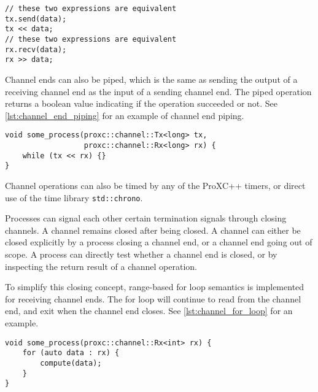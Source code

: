 \begin{lstfloat}
\begin{lstlisting}[caption={Channel operation and operator overloading.}, label={lst:channel_operation_operator_overloading}, style={CustomC++}]
// these two expressions are equivalent
tx.send(data);
tx << data;
// these two expressions are equivalent
rx.recv(data);
rx >> data;
\end{lstlisting}
\end{lstfloat}

Channel ends can also be piped, which is the same as sending the output of a receiving channel end as the input of a sending channel end. The piped operation returns a boolean value indicating if the operation succeeded or not. See \cref{lst:channel_end_piping} for an example of channel end piping.

\begin{lstfloat}
\begin{lstlisting}[caption={Channel end piping.}, label={lst:channel_end_piping}, style={CustomC++}]
void some_process(proxc::channel::Tx<long> tx,
                  proxc::channel::Rx<long> rx) {
    while (tx << rx) {}
}
\end{lstlisting}
\end{lstfloat}

Channel operations can also be timed by any of the ProXC++ timers, or direct use of the time library \lstinline[style={CustomC++}]|std::chrono|. 

Processes can signal each other certain termination signals through closing channels. A channel remains closed after being closed. A channel can either be closed explicitly by a process closing a channel end, or a channel end going out of scope. A process can directly test whether a channel end is closed, or by inspecting the return result of a channel operation.

To simplify this closing concept, range\hyp{}based for loop semantics is implemented for receiving channel ends. The for loop will continue to read from the channel end, and exit when the channel end closes. See \cref{lst:channel_for_loop} for an example.

\begin{lstfloat}
\begin{lstlisting}[caption={Range\hyp{}based for loop semantics for receiving channel ends.}, label={lst:channel_for_loop}, style={CustomC++}]
void some_process(proxc::channel::Rx<int> rx) {
    for (auto data : rx) {
        compute(data);
    }
}
\end{lstlisting}
\end{lstfloat}

